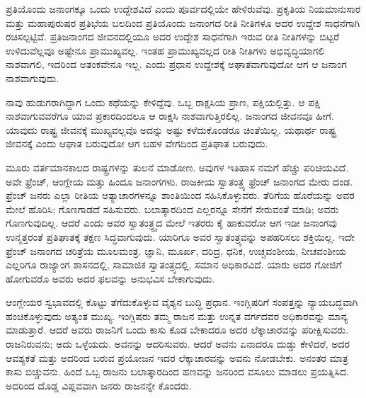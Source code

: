 ಪ್ರತಿಯೊಂದು ಜನಾಂಗಕ್ಕೂ ಒಂದು ಉದ್ದೇಶವಿದೆ ಎಂದು ಪೂರ್ವದಲ್ಲಿಯೇ ಹೇಳಿರುವೆವು. ಪ್ರಕೃತಿಯ ನಿಯಮಾನುಸಾರ ಮತ್ತು ಮಹಾಪುರುಷರ ಪ್ರತಿಭೆಯ ಬಲದಿಂದ ಪ್ರತಿಯೊಂದು ಜನಾಂಗದ ರೀತಿ ನೀತಿಗಳೂ ಅದರ ಉದ್ದೇಶ ಸಾಧನೆಗಾಗಿ ರಚಿಸಲ್ಪಟ್ಟಿವೆ. ಪ್ರತಿಜನಾಂಗದ ಜೀವನದಲ್ಲಿಯೂ ಅದರ ಉದ್ದೇಶ ಸಾಧನೆಗಾಗಿ ಇರುವ ರೀತಿ ನೀತಿಗಳನ್ನು ಬಿಟ್ಟರೆ ಉಳಿದುವೆಲ್ಲವೂ ಅಷ್ಟೇನೂ ಪ್ರಾಮುಖ್ಯವಲ್ಲ. ಇಂತಹ ಪ್ರಾಮುಖ್ಯವಲ್ಲದ ರೀತಿ ನೀತಿಗಳು ಅಭಿವೃದ್ಧಿಯಾಗಲಿ ನಾಶವಾಗಲಿ, ಇದರಿಂದ ಅತಂಕವೇನೂ ಇಲ್ಲ. ಎಂದು ಪ್ರಧಾನ ಉದ್ದೇಶಕ್ಕೆ ಅಘಾತವಾಗುವುದೋ ಆಗ ಆ ಜನಾಂಗ ನಾಶವಾಗುವುದು.

ನಾವು ಹುಡುಗರಾಗಿದ್ದಾಗ ಒಂದು ಕಥೆಯನ್ನು ಕೇಳಿದ್ದೆವು. ಒಬ್ಬ ರಾಕ್ಷಸಿಯ ಪ್ರಾಣ, ಪಕ್ಷಿಯಲ್ಲಿತ್ತು. ಆ ಪಕ್ಷಿ ನಾಶವಾಗುವವರೆಗೂ ಯಾವ ಪ್ರಕಾರದಿಂದಲೂ ಆ ರಾಕ್ಷಸಿ ನಾಶವಾಗುತ್ತಿರಲಿಲ್ಲ. ಜನಾಂಗದ ಜೀವನವೂ ಹೀಗೆ. ಯಾವುದು ರಾಷ್ಟ್ರ ಜೀವನಕ್ಕೆ ಮುಖ್ಯವಲ್ಲವೊ ಅದನ್ನು ಅಷ್ಟು ಕಳೆದುಕೊಂಡರೂ ಚಿಂತೆಯಿಲ್ಲ. ಯಥಾರ್ಥ ರಾಷ್ಟ್ರ ಜೀವನಕ್ಕೆ ಎಂದು ಆಘಾತ ಬರುವುದೋ ಆಗ ಬಹಳ ವೇಗದಿಂದ ಪ್ರತಿಘಾತ ಬರುವುದು.

ಮೂರು ವರ್ತಮಾನಕಾಲದ ರಾಷ್ಟ್ರಗಳನ್ನು ತುಲನೆ ಮಾಡೋಣ. ಅವುಗಳ ಇತಿಹಾಸ ನಮಗೆ ಹೆಚ್ಚು ಪರಿಚಯವಿದೆ. ಅವೇ ಫ್ರೆಂಚ್​, ಆಂಗ್ಲೇಯ ಮತ್ತು ಹಿಂದೂ ಜನಾಂಗಗಳು. ರಾಜಕೀಯ ಸ್ವಾತಂತ್ರ್ಯ ಫ್ರೆಂಚ್​ ಜನಾಂಗದ ಮೇರು ದಂಡ. ಫ್ರೆಂಚ್​ ಜನರು ಎಲ್ಲಾ ರೀತಿಯ ಅತ್ಯಾಚಾರಗಳನ್ನೂ ಶಾಂತಿಯಿಂದ ಸಹಿಸಿಕೊಳ್ಳುವರು. ತೆರಿಗೆಯ ಹೊರೆಯನ್ನು ಅವರ ಮೇಲೆ ಹೊರಿಸಿ; ಗೊಣಗಾಡದೆ ಸಹಿಸುವರು. ಬಲಾತ್ಕಾರದಿಂದ ಎಲ್ಲರನ್ನೂ ಸೇನೆಗೆ ಸೇರುವಂತೆ ಮಾಡಿ; ಅವರು ಗೊಣಗುವುದಿಲ್ಲ. ಆದರೆ ಎಂದು ಅವರ ಸ್ವಾತಂತ್ರ್ಧ್ಯದ ಮೇಲೆ ಇತರರು ಕೈ ಹಾಕುವರೋ ಆಗ ಇಡೀ ಜನಾಂಗವು ಉನ್ಮತ್ತರಂತೆ ಪ್ರತಿಘಾತಕ್ಕೆ ತಕ್ಷಣ ಸಿದ್ಧವಾಗುವುದು. ಯಾರಿಗೂ ಅವರ ಸ್ವಾತಂತ್ರ್ಯವನ್ನು ಅಪಹರಿಸಲು ಶಕ್ತಿಯಿಲ್ಲ. ಇದೇ ಫ್ರೆಂಚ್​ ಜನಾಂಗದ ಚರಿತ್ರೆಯ ಮೂಲಮಂತ್ರ. ಜ್ಞಾನಿ, ಮೂರ್ಖ, ದರಿದ್ರ, ಧನಿಕ, ಉಚ್ಚವಂಶೀಯ, ನೀಚವಂಶೀಯ ಎಲ್ಲರಿಗೂ ರಾಜ್ಯಾಂಗ ಶಾಸನದಲ್ಲಿ, ಸಾಮಾಜಿಕ ಸ್ವಾತಂತ್ರ್ಯದಲ್ಲಿ, ಸಮಾನ ಅಧಿಕಾರವಿದೆ. ಯಾರು ಅದರ ಗೋಜಿಗೆ ಹೋಗುವರೊ ಅವರು ಅದರ ಫಲವನ್ನು ಅನುಭವಿಸ ಬೇಕಾಗುವುದು.

ಆಂಗ್ಲೇಯರ ಸ್ವಭಾವದಲ್ಲಿ ಕೊಟ್ಟು ತೆಗೆದುಕೊಳ್ಳುವ ವೈಶ್ಯನ ಬುದ್ಧಿ ಪ್ರಧಾನ. ಇಂಗ್ಲಿಷರಿಗೆ ಸಂಪತ್ತನ್ನು ನ್ಯಾಯಬದ್ಧವಾಗಿ ಹಂಚಿಕೊಳ್ಳುವುದು ಅತ್ಯಂತ ಮುಖ್ಯ. ಇಂಗ್ಲಿಷರು ತಮ್ಮ ರಾಜನ ಮತ್ತು ಉನ್ನತ ವರ್ಗದವರ ಅಧಿಕಾರವನ್ನು ಮಾನ್ಯ ಮಾಡುತ್ತಾರೆ. ಆದರೆ ಅವರು ರಾಜನಿಗೆ ಒಂದು ಕಾಸು ಕೊಡ ಬೇಕಾದರೂ ಅದರ ಲೆಕ್ಕಾಚಾರವನ್ನು ಪರೀಕ್ಷಿಸುವರು. ರಾಜನಿರುವನು; ಅದು ಒಳ್ಳೆಯದು. ಅವನನ್ನು ಆದರಿಸುವರು. ಆದರೆ ಅವನು ಏನಾದರೂ ದುಡ್ಡು ಕೇಳಿದರೆ, ಅದರ ಆವಶ್ಯಕತೆ ಮತ್ತು ಅದರಿಂದ ಬರುವ ಪ್ರಯೋಜನ ಇದರ ಲೆಕ್ಕಾಚಾರವನ್ನು ಅವನು ನೋಡಬೇಕು. ಅನಂತರ ಮಾತ್ರ ಕಾಸು ಬಿಚ್ಚುವನು. ಹಿಂದೆ ಒಬ್ಬ ರಾಜನು ಬಲಾತ್ಕಾರದಿಂದ ಹಣವನ್ನು ಜನರಿಂದ ವಸೂಲು ಮಾಡಲು ಪ್ರಯತ್ನಿಸಿದ. ಅದರಿಂದ ದೊಡ್ಡ ವಿಪ್ಲವವಾಗಿ ಜನರು ರಾಜನನ್ನೇ ಕೊಂದರು.

